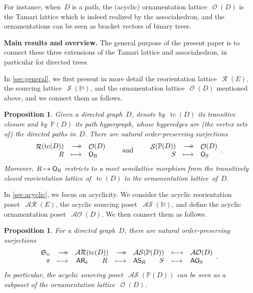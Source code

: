 \documentclass{amsart}
\newtheorem{proposition}[theorem]{Proposition}
\theoremstyle{definition}
\renewcommand{\c}[1]{\mathcal{#1}} %
\newcommand{\surjection}{\longrightarrow\mathrel{\mkern-22mu}\rightarrow\,}
\newcommand{\bijection}{\longleftrightarrow}
\DeclareMathOperator{\tc}{tc} %
\newcommand{\para}[1]{\bigskip\noindent\textbf{#1}} %
\newcommand{\fS}{\mathfrak{S}} %
\newcommand{\mymap}[2]{\mathsf{#1}_{\hspace{-.7pt}#2}}
\DeclareMathOperator{\Orn}{\c{O}}  %
\newcommand{\orn}[1]{\mymap{O}{#1}}  %
\DeclareMathOperator{\AOrn}{\c{AO}}  %
\newcommand{\aorn}[1]{\mymap{AO}{#1}}  %
\DeclareMathOperator{\Reori}{\c{R}}  %
\DeclareMathOperator{\AReori}{\c{AR}}  %
\newcommand{\areori}[1]{\mymap{AR}{#1}}  %
\DeclareMathOperator{\Sour}{\mathcal{S}}  %
\DeclareMathOperator{\ASour}{\mathcal{AS}}  %
\newcommand{\asour}[1]{\mymap{AS}{#1}}  %
\newcommand{\HH}{\mathbb H}  %
\newcommand{\PP}{\mathbb P} %
\begin{document}
For instance, when~$D$ is a path, the (acyclic) ornamentation lattice~$\Orn(D)$ is the Tamari lattice which is indeed realized by the associahedron, and the ornamentations can be seen as bracket vectors of binary trees.


\medskip
\para{Main results and overview.}
The general purpose of the present paper is to connect these three extensions of the Tamari lattice and associahedron, in particular for directed trees.

In \cref{sec:general}, we first present in more detail the reorientation lattice~$\Reori(E)$, the sourcing lattice~$\Sour(\HH)$, and the ornamentation lattice~$\Orn(D)$ mentioned above, and we connect them as \linebreak follows.

\begin{proposition}
Given a directed graph~$D$, denote by~$\tc(D)$ its transitive closure and by~$\PP(D)$ its path hypergraph, whose hyperedges are (the vertex sets of) the directed paths in~$D$.
There are natural order-preserving surjections
\[
\begin{array}{rcl}
	\Reori(\tc(D)) & \surjection & \Orn(D) \\
	R & \longmapsto & \orn{R}
\end{array}
\qquad\text{and}\qquad
\begin{array}{rcl}
	\Sour(\PP(D)) & \surjection & \Orn(D) \\
	S & \longmapsto & \orn{S}
\end{array}
.
\]
Moreover, $R \mapsto \orn{R}$ restricts to a meet semilattice morphism from the transitively closed reorientation lattice of~$\tc(D)$ to the ornamentation lattice~of~$D$.
\end{proposition}

In \cref{sec:acyclic}, we focus on acyclicity.
We consider the acyclic reorientation poset~$\AReori(E)$, the acyclic sourcing poset~$\ASour(\HH)$, and define the acyclic ornamentation poset~$\AOrn(D)$. We then connect them as follows.

\begin{proposition}
For a directed graph~$D$, there are natural order-preserving surjections
\[
\begin{array}{rcccccl}
	\fS_n & \surjection & \AReori(\tc(D)) & \surjection & \ASour(\PP(D)) & \bijection & \AOrn(D) \\
	\pi & \longmapsto & \areori{\pi} \qquad R & \longmapsto & \asour{R} \qquad S & \longmapsto & \aorn{S}
\end{array}
.
\]
In particular, the acyclic sourcing poset~$\ASour(\PP(D))$ can be seen as a subposet of the ornamentation lattice~$\Orn(D)$.
\end{proposition}
\end{document}
